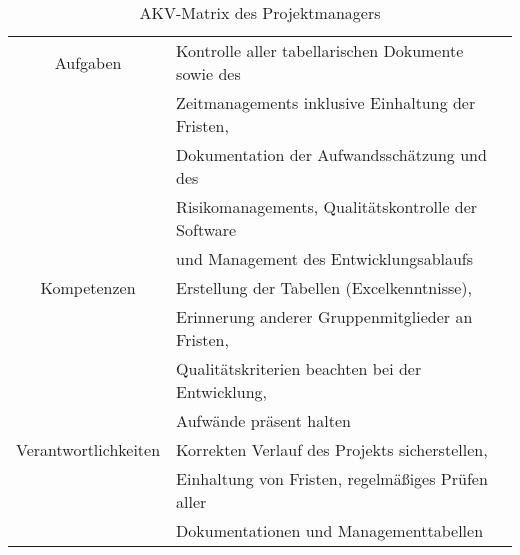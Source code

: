 \vspace{1cm}
\begin{table}[H]
    \begin{center}
        \label{tab:projektmanager}
        \begin{tabular}{|c||p{9cm}|}
            \hline
            Aufgaben & Kontrolle aller tabellarischen Dokumente sowie des \\
            & Zeitmanagements inklusive Einhaltung der Fristen, \\
            & Dokumentation der Aufwandsschätzung und des\\
            & Risikomanagements, Qualitätskontrolle der Software \\
            & und Management des Entwicklungsablaufs \\
            \hline
            Kompetenzen & Erstellung der Tabellen (Excelkenntnisse), \\
            & Erinnerung anderer Gruppenmitglieder an Fristen, \\
            & Qualitätskriterien beachten bei der Entwicklung, \\
            & Aufwände präsent halten \\
            \hline
            Verantwortlichkeiten & Korrekten Verlauf des Projekts sicherstellen, \\
            & Einhaltung von Fristen, regelmäßiges Prüfen aller  \\
            & Dokumentationen und Managementtabellen \\
            \hline
        \end{tabular}
        \caption{AKV-Matrix des Projektmanagers}
    \end{center}
\end{table}
